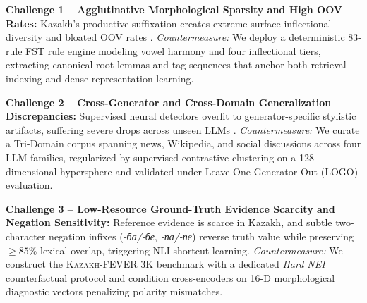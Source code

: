 \noindent\textbf{Challenge 1 -- Agglutinative Morphological Sparsity and High OOV Rates:}
Kazakh's productive suffixation creates extreme surface inflectional diversity and bloated OOV rates \cite{tyers2012free}. \textit{Countermeasure:} We deploy a deterministic 83-rule FST rule engine modeling vowel harmony and four inflectional tiers, extracting canonical root lemmas and tag sequences that anchor both retrieval indexing and dense representation learning.

\vspace{0.1cm}
\noindent\textbf{Challenge 2 -- Cross-Generator and Cross-Domain Generalization Discrepancies:}
Supervised neural detectors overfit to generator-specific stylistic artifacts, suffering severe drops across unseen LLMs \cite{wang2024raid}. \textit{Countermeasure:} We curate a Tri-Domain corpus spanning news, Wikipedia, and social discussions across four LLM families, regularized by supervised contrastive clustering on a 128-dimensional hypersphere and validated under Leave-One-Generator-Out (LOGO) evaluation.

\vspace{0.1cm}
\noindent\textbf{Challenge 3 -- Low-Resource Ground-Truth Evidence Scarcity and Negation Sensitivity:}
Reference evidence is scarce in Kazakh, and subtle two-character negation infixes (\textit{-ба/-бе}, \textit{-па/-пе}) reverse truth value while preserving $\ge 85\%$ lexical overlap, triggering NLI shortcut learning. \textit{Countermeasure:} We construct the \textsc{Kazakh-FEVER 3K} benchmark with a dedicated \textit{Hard NEI} counterfactual protocol and condition cross-encoders on 16-D morphological diagnostic vectors penalizing polarity mismatches.
